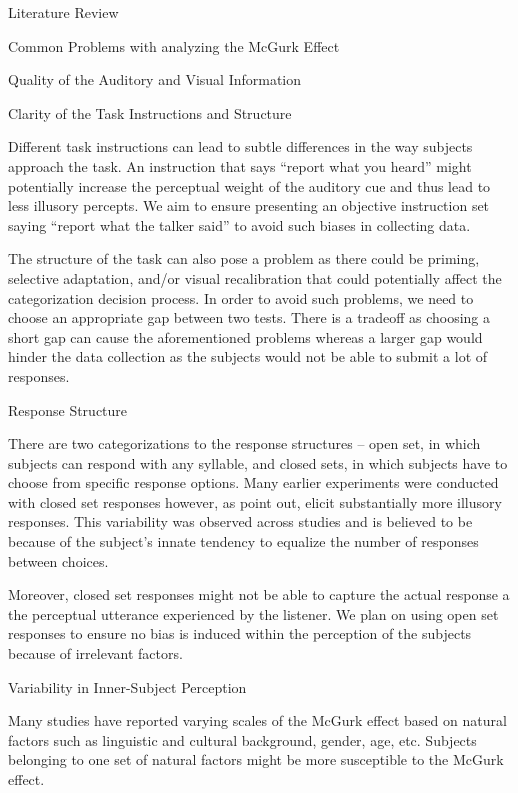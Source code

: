 \documentclass{article}
\begin{document}
\begin{psection}{Literature Review}
\begin{psubsection}{Common Problems with analyzing the McGurk Effect}
\begin{pssubsection}{Quality of the Auditory and Visual Information}
		\end{pssubsection}

		\begin{pssubsection}{Clarity of the Task Instructions and Structure}

			Different task instructions can lead to subtle differences in the way subjects approach the task. An instruction that says ``report what you heard'' might potentially increase the perceptual weight of the auditory cue and thus lead to less illusory percepts. We aim to ensure presenting an objective instruction set saying ``report what the talker said'' to avoid such biases in collecting data.

			The structure of the task can also pose a problem as there could be priming, selective adaptation, and/or visual recalibration that could potentially affect the categorization decision process. In order to avoid such problems, we need to choose an appropriate gap between two tests. There is a tradeoff as choosing a short gap can cause the aforementioned problems whereas a larger gap would hinder the data collection as the subjects would not be able to submit a lot of responses.

		\end{pssubsection}

		\begin{pssubsection}{Response Structure}

			There are two categorizations to the response structures -- open set, in which subjects can respond with any syllable, and closed sets, in which subjects have to choose from specific response options. Many earlier experiments were conducted with closed set responses however, as \cite{40-years} point out, elicit substantially more illusory responses. This variability was observed across studies and is believed to be because of the subject's innate tendency to equalize the number of responses between choices.

			Moreover, closed set responses might not be able to capture the actual response a the perceptual utterance experienced by the listener. We plan on using open set responses to ensure no bias is induced within the perception of the subjects because of irrelevant factors.

		\end{pssubsection}

		\begin{pssubsection}{Variability in Inner-Subject Perception}

			Many studies have reported varying scales of the McGurk effect based on natural factors such as linguistic and cultural background, gender, age, etc. Subjects belonging to one set of natural factors might be more susceptible to the McGurk effect.


\end{pssubsection}
\end{psubsection}
\end{psection}
\end{document}

